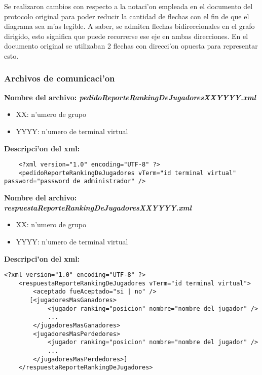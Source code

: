 Se realizaron cambios con respecto a la notaci'on empleada en el documento del protocolo original para poder reducir la cantidad de flechas con el fin de que el diagrama sea m'as legible. A saber, se admiten flechas bidireccionales en el grafo dirigido, esto significa que puede recorrerse ese eje en ambas direcciones. En el documento original se utilizaban 2 flechas con direcci'on opuesta para representar esto.


\clearpage
\subsubsection{Archivos de comunicaci'on}

\bf{Nombre del archivo:} \it{pedidoReporteRankingDeJugadoresXXYYYY.xml}
\begin{itemize}
    \item{XX: n'umero de grupo}
    \item{YYYY: n'umero de terminal virtual}
\end{itemize}

\bf{Descripci'on del xml:}
\begin{verbatim}
    <?xml version="1.0" encoding="UTF-8" ?>
    <pedidoReporteRankingDeJugadores vTerm="id terminal virtual" password="password de administrador" />
\end{verbatim}


\bf{Nombre del archivo:} \it{respuestaReporteRankingDeJugadoresXXYYYY.xml}
\begin{itemize}
    \item{XX: n'umero de grupo}
    \item{YYYY: n'umero de terminal virtual}
\end{itemize}

\bf{Descripci'on del xml:}
\begin{verbatim}
<?xml version="1.0" encoding="UTF-8" ?>
    <respuestaReporteRankingDeJugadores vTerm="id terminal virtual">
        <aceptado fueAceptado="si | no" />
       [<jugadoresMasGanadores>
            <jugador ranking="posicion" nombre="nombre del jugador" />
            ...
        </jugadoresMasGanadores>
        <jugadoresMasPerdedores>
            <jugador ranking="posicion" nombre="nombre del jugador" />
            ...
        </jugadoresMasPerdedores>]
    </respuestaReporteRankingDeJugadores>
\end{verbatim}


